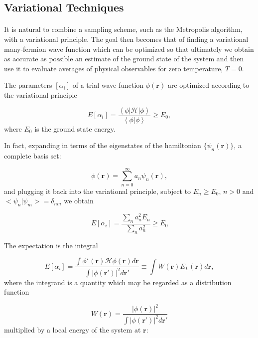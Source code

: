 \documentclass[10pt, twocolumn, twoside]{article}
\begin{document}
\subsection{Variational Techniques}\paragraph{}

It is natural to combine a sampling scheme, such as the Metropolis algorithm, with a variational principle. The goal then becomes that of finding a variational many-fermion wave function which can be optimized so that ultimately we obtain as accurate as possible an estimate of the ground state of the system and then use it to evaluate averages of physical observables for zero temperature, $T=0$.

The parameters $[\alpha_i]$ of a trial wave function $\phi(\bm r)$ are optimized according to the variational principle

\begin{equation}
E[\alpha_i] = \frac{\left\langle \phi \left| \mathcal{H} \right| \phi \right\rangle}{\left\langle \phi | \phi \right\rangle} \ge E_0,
\end{equation}
where $E_0$ is the ground state energy.

In fact, expanding in terms of the eigenstates of the hamiltonian $\{ \psi_n (\bm r) \}$, a complete basis set:

\begin{equation}
\phi (\bm r) = \sum_{n= 0}^{\infty} a_n \psi_n (\bm r) ,
\end{equation}
and plugging it back into the variational principle, subject to $E_n \ge E_0 ,\, n > 0$ and $<\psi_n | \psi_m> = \delta_{nm}$ we obtain

\begin{equation}
E[\alpha_i] = \frac{\sum_n a_n^2 E_n}{\sum_n a_n^2 } \ge E_0
\end{equation}

The expectation is the integral

\begin{equation}
E[\alpha_i] = \frac{\int \phi^\star (\bm r) \mathcal{H} \phi (\bm r) d\bm r}{\int | \phi (\bm r') |^2 d\bm r'} \equiv \int W(\bm r) E_L(\bm r) d\bm r ,
\end{equation}
where the integrand is a quantity which may be regarded as a distribution function 

\begin{equation}
W(\bm r) = \frac{|\phi (\bm r)|^2}{\int |\phi(\bm r')|^2 d\bm r'}
\end{equation}
multiplied by a local energy of the system at $\bm r$:
\end{document}
